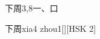 \begin{entry}{下周}{3,8}{⼀、⼝}
  \begin{phonetics}{下周}{xia4 zhou1}[][HSK 2]
  \end{phonetics}
\end{entry}
